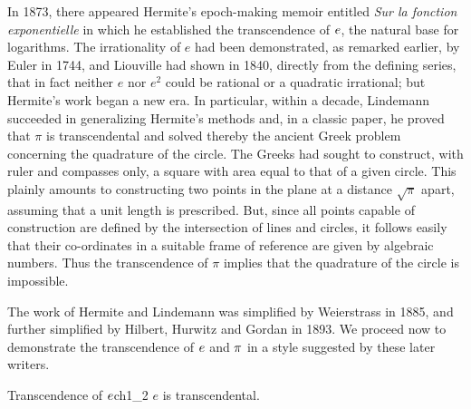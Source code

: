 In 1873, there appeared Hermite's epoch-making memoir entitled \textit{Sur la fonction exponentielle} in which he established the transcendence of $e\index{transcendence of e}$, the natural base for logarithms. The irrationality of $e$ had been demonstrated, as remarked earlier, by Euler in 1744, and Liouville had shown in 1840, directly from the defining series, that in fact neither $e$ nor $e^2$ could be rational or a quadratic irrational; but Hermite's work began a new era. In particular, within a decade, Lindemann succeeded in generalizing Hermite's methods and, in a classic paper, he proved that $\pi$ is transcendental and solved thereby the ancient Greek problem concerning the quadrature of the circle. The Greeks had sought to construct, with ruler and compasses only, a square with area equal to that of a given circle. This plainly amounts to constructing two points in the plane at a distance $\sqrt{\pi}$ apart, assuming that a unit length is prescribed. But, since all points capable of construction are defined by the intersection of lines and circles, it follows easily that their co-ordinates in a suitable frame of reference are given by algebraic numbers. Thus the transcendence of $\pi$ implies that the quadrature of the circle is impossible.

The work of Hermite and Lindemann was simplified by Weierstrass in 1885, and further simplified by Hilbert, Hurwitz and Gordan in 1893. We proceed now to demonstrate the transcendence of $e\index{transcendence of e}$ and $\pi\index{transcendence of  $\pi$}$ in a style suggested by these later writers.

\begin{mythm}{Transcendence of $e\index{transcendence of e}$}{ch1_2}
$e$ is transcendental.
\end{mythm}

